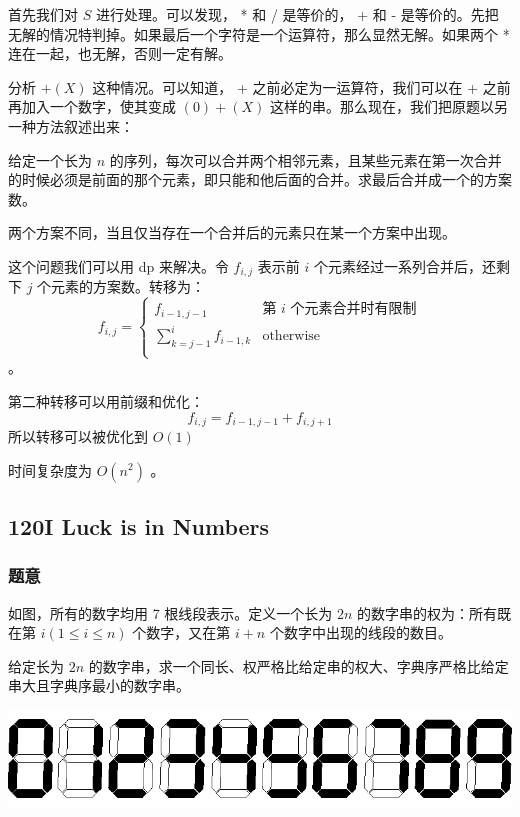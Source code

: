\documentclass[11pt]{article}
\begin{document}
    首先我们对 $S$ 进行处理。可以发现， * 和 / 是等价的， + 和 - 是等价的。先把无解的情况特判掉。如果最后一个字符是一个运算符，那么显然无解。如果两个 * 连在一起，也无解，否则一定有解。

    分析 $+(X)$ 这种情况。可以知道， + 之前必定为一运算符，我们可以在 + 之前再加入一个数字，使其变成 $(0)+(X)$ 这样的串。那么现在，我们把原题以另一种方法叙述出来：

\begin{problem}
  给定一个长为 $n$ 的序列，每次可以合并两个相邻元素，且某些元素在第一次合并的时候必须是前面的那个元素，即只能和他后面的合并。求最后合并成一个的方案数。

  两个方案不同，当且仅当存在一个合并后的元素只在某一个方案中出现。
\end{problem}

    这个问题我们可以用 dp 来解决。令 $f_{i, j}$ 表示前 $i$ 个元素经过一系列合并后，还剩下 $j$ 个元素的方案数。转移为：
    $$f_{i, j} = \begin{cases} f_{i - 1, j - 1} & \text{第 $i$ 个元素合并时有限制} \\ \sum_{k = j - 1}^i f_{i - 1, k} & \text{otherwise} \\ \end{cases}$$ 。

    第二种转移可以用前缀和优化： $$f_{i, j} = f_{i - 1, j - 1} + f_{i, j + 1}$$
    所以转移可以被优化到 $O(1)$ 

    时间复杂度为 $O(n^2)$ 。
\subsection{120I  Luck is in Numbers}
\label{sec-8-5}
\subsubsection{题意}
\label{sec-8-5-1}

    如图，所有的数字均用 7 根线段表示。定义一个长为 $2n$ 的数字串的权为：所有既在第 $i (1 \leq i \leq n)$ 个数字，又在第 $i +n$ 个数字中出现的线段的数目。

    给定长为 $2n$ 的数字串，求一个同长、权严格比给定串的权大、字典序严格比给定串大且字典序最小的数字串。

\includegraphics[scale = 0.6]{pic/120I.png}
\end{document}
